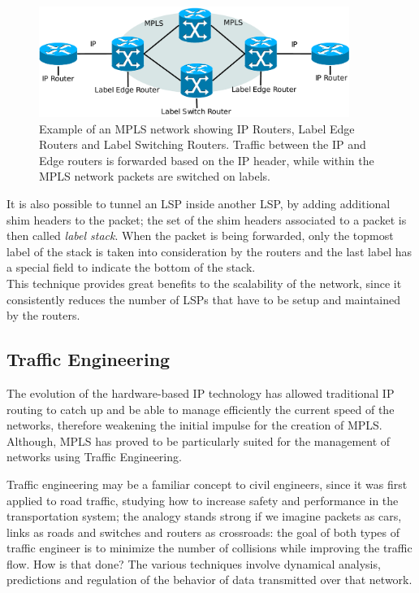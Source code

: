 \documentclass[10pt,a4paper]{report}
\begin{document}
\begin{figure}[!hbp]
  \centering
  \includegraphics[width=0.9\textwidth]{img/mpls_net}
  \caption[MPLS network example]{Example of an MPLS network showing IP
    Routers, Label Edge Routers and Label Switching Routers. Traffic
    between the IP and Edge routers is forwarded based on the IP
    header, while within the MPLS network packets are switched on
    labels.}
  \label{fig:mpls_net}
\end{figure}

\newpage

It is also possible to tunnel an LSP inside another LSP, by adding
additional shim headers to the packet; the set of the shim headers
associated to a packet is then called \textit{label stack}. When the
packet is being forwarded, only the topmost label of the stack is
taken into consideration by the routers and the last label has a
special field to indicate the bottom of the stack. \\
This technique provides great benefits to the scalability of the
network, since it consistently reduces the number of LSPs that have to
be setup and maintained by the routers.

\subsection{Traffic Engineering}
The evolution of the hardware-based IP technology has allowed
traditional IP routing to catch up and be able to manage efficiently
the current speed of the networks, therefore weakening the initial
impulse for the creation of MPLS\@. Although, MPLS has proved to be
particularly suited for the management of networks using Traffic
Engineering.

Traffic engineering may be a familiar concept to civil engineers,
since it was first applied to road traffic, studying how to increase
safety and performance in the transportation system; the analogy
stands strong if we imagine packets as cars, links as roads and
switches and routers as crossroads: the goal of both types of traffic
engineer is to minimize the number of collisions while improving the
traffic flow. How is that done? The various techniques involve
dynamical analysis, predictions and regulation of the behavior of data
transmitted over that network.
\end{document}
